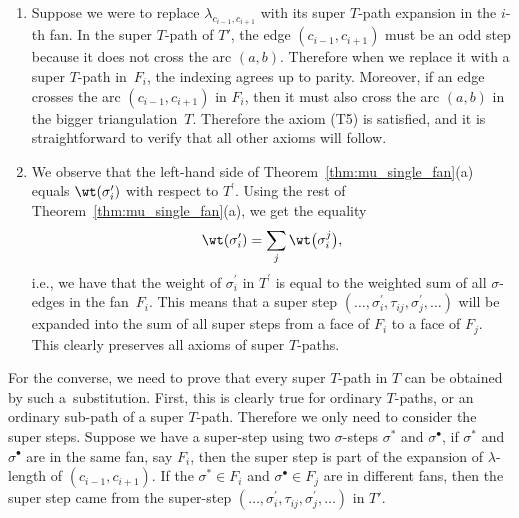 \begin{enumerate} \itemsep=0pt
 \item[(1)] Suppose we were to replace $\lambda_{c_{i-1},c_{i+1}}$ with its super $T$-path expansion in the $i$-th fan.
 In the super $T$-path of $T'$, the edge $(c_{i-1},c_{i+1})$ must be an odd step because it does not cross the arc $(a,b)$.
 Therefore when we replace it with a super $T$-path in~$F_i$, the indexing agrees up to parity.
Moreover, if an edge crosses the arc $(c_{i-1},c_{i+1})$ in $F_i$, then it must also cross the arc $(a,b)$ in the bigger triangulation~$T$.
 Therefore the axiom (T5) is satisfied, and it is straightforward to verify that all other axioms will follow.

 \item[(2)] We observe that the left-hand side of Theorem~\ref{thm:mu_single_fan}(a)
 equals $\wt(\sigma_i^\prime)$ with respect to $T^\prime$. Using the rest of Theorem~\ref{thm:mu_single_fan}(a), we get the equality
 \[\wt(\sigma_i^\prime)=\sum_{j}\wt\big(\sigma_i^j\big),\]
 i.e., we have that the weight of $\sigma_i^\prime$ in $T^\prime$ is equal to the weighted sum of all $\sigma$-edges in the fan~$F_i$.
 This means that a super step $(\dots,\sigma_i^\prime,\tau_{ij},\sigma_j^\prime,\dots)$ will be expanded into the sum of all
 super steps from a face of $F_i$ to a face of $F_j$. This clearly preserves all axioms of super $T$-paths.
\end{enumerate}

For the converse, we need to prove that every super $T$-path in $T$ can be obtained by such a~substitution.
First, this is clearly true for ordinary $T$-paths, or an ordinary sub-path of a super $T$-path. Therefore we only need to consider the super steps.
Suppose we have a super-step using two $\sigma$-steps $\sigma^*$ and $\sigma^\bullet$, if $\sigma^*$ and $\sigma^\bullet$ are in the same fan,
say $F_i$, then the super step is part of the expansion of $\lambda$-length of $(c_{i-1},c_{i+1})$.
If the $\sigma^*\in F_i$ and $\sigma^\bullet\in F_j$ are in different fans, then the super step came from the super-step
$(\dots,\sigma_i^\prime,\tau_{ij},\sigma_j^\prime,\dots)$ in $T'$.

